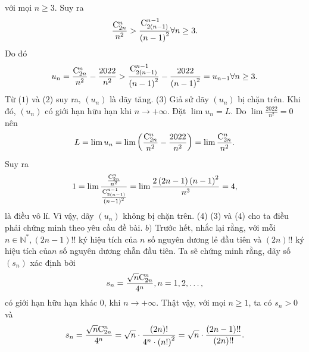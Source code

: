\begin{multicols}{2}
\begin{align*}
	\end{align*}
	với mọi $n \ge  3$. Suy ra
	\begin{align*}
		\frac{{{\rm{C}}_{2n}^n}}{{{n^2}}} > \frac{{{\rm{C}}_{2\left( {n - 1} \right)}^{n - 1}}}{{{{\left( {n - 1} \right)}^2}}}\forall n \ge 3.
	\end{align*}
	Do đó
	\begin{align*}
		{u_n} = \frac{{{\rm{C}}_{2n}^n}}{{{n^2}}} - \frac{{2022}}{{{n^2}}} > \frac{{{\rm{C}}_{2\left( {n - 1} \right)}^{n - 1}}}{{{{\left( {n - 1} \right)}^2}}} - \frac{{2022}}{{{{\left( {n - 1} \right)}^2}}} = {u_{n - 1}}\forall n \ge 3.
	\end{align*}
	Từ ($1$) và ($2$) suy ra, $(u_n)$  là dãy tăng.                \hfill ($3$)
	\vskip 0.05cm
	Giả sử dãy $(u_n)$  bị chặn trên. Khi đó, $(u_n)$  có giới hạn hữu hạn khi  $n \to + \infty$. Đặt $\lim {u_n} = L.$
	\vskip 0.05cm 
	Do $\lim \frac{{2022}}{{{n^2}}} = 0$  nên
	\begin{align*}
		L = \lim {u_n} = \lim \left( {\frac{{{\rm{C}}_{2n}^n}}{{{n^2}}} - \frac{{2022}}{{{n^2}}}} \right) = \lim \frac{{{\rm{C}}_{2n}^n}}{{{n^2}}}.
	\end{align*}
	Suy ra
	\begin{align*}
		1 = \lim \frac{{\frac{{{\rm{C}}_{2n}^n}}{{{n^2}}}}}{{\frac{{{\rm{C}}_{2\left( {n - 1} \right)}^{n - 1}}}{{{{\left( {n - 1} \right)}^2}}}}} = \lim \frac{{2\left( {2n - 1} \right){{\left( {n - 1} \right)}^2}}}{{{n^3}}} = 4,
	\end{align*}
	là điều vô lí. Vì vậy, dãy  $(u_n)$ không bị chặn trên.                            \hfill ($4$)
	\vskip 0.05cm
	($3$) và ($4$) cho ta điều phải chứng minh theo yêu cầu đề bài.
	\vskip 0.05cm
	$b)$ Trước hết, nhắc lại rằng, với mỗi $n \in \mathbb{N^*}, (2n-1)!!$    ký hiệu tích của $n$ số nguyên dương lẻ đầu tiên và $(2n)!!$  ký hiệu tích của$ n$ số nguyên dương chẵn đầu tiên.
	\vskip 0.05cm
	Ta sẽ chứng minh rằng, dãy số $(s_n)$  xác định bởi
	\begin{align*}
		{s_n} = \frac{{\sqrt n {\rm{C}}_{2n}^n}}{{{4^n}}}, n = 1,2,\ldots,
	\end{align*}
	có giới hạn hữu hạn khác $0$, khi $ n \to + \infty$.
	\vskip 0.05cm 
	Thật vậy, với mọi $n \ge  1$, ta có $s_n > 0$  và
	\begin{align*}
		{s_n} = \frac{{\sqrt n {\rm{C}}_{2n}^n}}{{{4^n}}} = \sqrt n  \cdot \frac{{\left( {2n} \right)!}}{{{4^n} \cdot {{\left( {n!} \right)}^2}}} = \sqrt n  \cdot \frac{{\left( {2n - 1} \right)!!}}{{\left( {2n} \right)!!}}.
	\end{align*}

\end{multicols}
